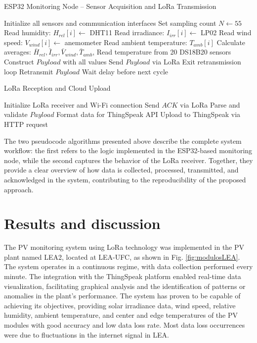 \documentclass{ieeeaccess}
\begin{document}
\begin{algorithm}
\caption{ESP32 Monitoring Node – Sensor Acquisition and LoRa Transmission}
\begin{algorithmic}[1]
\STATE Initialize all sensors and communication interfaces
\LOOP
    \STATE Set sampling count $N \gets 55$
        \STATE Read humidity: $H_{rel}[i] \gets$ DHT11
        \STATE Read irradiance: $I_{irr}[i] \gets$ LP02
        \STATE Read wind speed: $V_{wind}[i] \gets$ anemometer
        \STATE Read ambient temperature: $T_{amb}[i]$
    \ENDFOR
    \STATE Calculate averages: $\bar{H}_{rel}, \bar{I}_{irr}, \bar{V}_{wind}, \bar{T}_{amb}$, 
    \STATE Read temperature from 20 DS18B20 sensors
    \STATE Construct $Payload$ with all values
    \STATE Send $Payload$ via LoRa
            \STATE Exit retransmission loop
        \ELSE
            \STATE Retransmit $Payload$
        \ENDIF
    \ENDFOR
    \STATE Wait delay before next cycle
\ENDLOOP
\end{algorithmic}
\end{algorithm}


\begin{algorithm}
\caption{LoRa Reception and Cloud Upload}
\label{alg:gateway_logic}
\begin{algorithmic}[1]
\STATE Initialize LoRa receiver and Wi-Fi connection
\LOOP
        \STATE Send $ACK$ via LoRa
        \STATE Parse and validate $Payload$
        \STATE Format data for ThingSpeak API
        \STATE Upload to ThingSpeak via HTTP request
    \ENDIF
\ENDLOOP
\end{algorithmic}
\end{algorithm}

The two pseudocode algorithms presented above describe the complete system workflow: the first refers to the logic implemented in the ESP32-based monitoring node, while the second captures the behavior of the LoRa receiver. Together, they provide a clear overview of how data is collected, processed, transmitted, and acknowledged in the system, contributing to the reproducibility of the proposed approach.


\section{Results and discussion}
\label{sec:resul}


The PV monitoring system using LoRa technology was implemented in the PV plant named LEA2, located at LEA-UFC, as shown in Fig. \ref{fig:modulosLEA}. The system operates in a continuous regime, with data collection performed every minute. The integration with the ThingSpeak platform enabled real-time data visualization, facilitating graphical analysis and the identification of patterns or anomalies in the plant's performance. The system has proven to be capable of achieving its objectives, providing solar irradiance data, wind speed, relative humidity, ambient temperature, and center and edge temperatures of the PV modules with good accuracy and low data loss rate. Most data loss occurrences were due to fluctuations in the internet signal in LEA.
\end{document}
